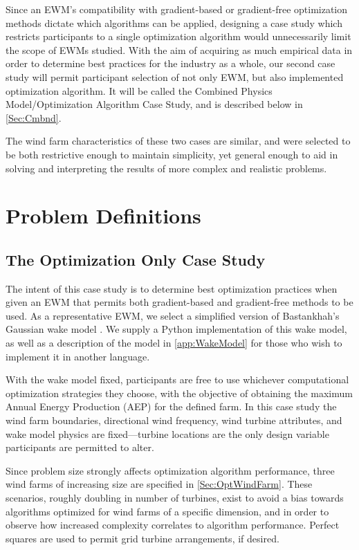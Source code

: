 \documentclass[12pt]{article}
\begin{document}
    Since an EWM's compatibility with gradient-based or gradient-free optimization methods dictate which algorithms can be applied, designing a case study which restricts participants to a single optimization algorithm would unnecessarily limit the scope of EWMs studied. With the aim of acquiring as much empirical data in order to determine best practices for the industry as a whole, our second case study will permit participant selection of not only EWM, but also implemented optimization algorithm. It will be called the Combined Physics Model/Optimization Algorithm Case Study, and is described below in \cref{Sec:Cmbnd}.
    
    The wind farm characteristics of these two cases are similar, and were selected to be both restrictive enough to maintain simplicity, yet general enough to aid in solving and interpreting the results of more complex and realistic problems.

\section{Problem Definitions}
\subsection{The Optimization Only Case Study}\label{Sec:OptOnly}
    The intent of this case study is to determine best optimization practices when given an EWM that permits both gradient-based and gradient-free methods to be used. As a representative EWM, we select a simplified version of Bastankhah's Gaussian wake model \cite{Thomas2018,Bastankhah2014,Bastankhah2016}. We supply a Python implementation of this wake model, as well as a description of the model in \cref{app:WakeModel} for those who wish to implement it in another language.

    With the wake model fixed, participants are free to use whichever computational optimization strategies they choose, with the objective of obtaining the maximum Annual Energy Production (AEP) for the defined farm. In this case study the wind farm boundaries, directional wind frequency, wind turbine attributes, and wake model physics are fixed---turbine locations are the only design variable participants are permitted to alter.
    
    Since problem size strongly affects optimization algorithm performance, three wind farms of increasing size are specified in \cref{Sec:OptWindFarm}. These scenarios, roughly doubling in number of turbines, exist to avoid a bias towards algorithms optimized for wind farms of a specific dimension, and in order to observe how increased complexity correlates to algorithm performance. Perfect squares are used to permit grid turbine arrangements, if desired.
    
\end{document}
